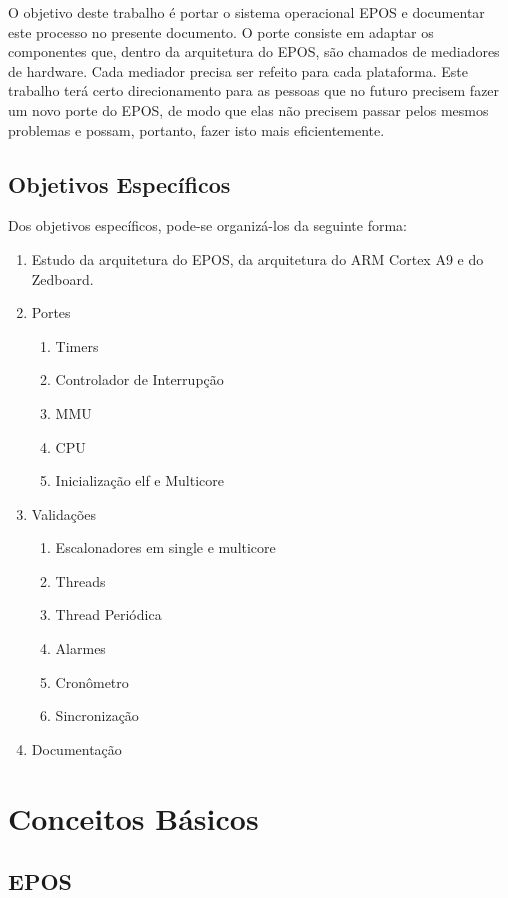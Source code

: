 \documentclass{ufscThesis/ufscThesis} %
\begin{document}
O objetivo deste trabalho é portar o sistema operacional EPOS e documentar este processo no presente documento. O porte consiste em adaptar os componentes que, dentro da arquitetura do EPOS, são chamados de mediadores de hardware. Cada mediador precisa ser refeito para cada plataforma.
Este trabalho terá certo direcionamento para as pessoas que no futuro precisem fazer um novo porte do EPOS, de modo que elas não precisem passar pelos mesmos problemas e possam, portanto, fazer isto mais eficientemente.

\section{Objetivos Específicos}
Dos objetivos específicos, pode-se organizá-los da seguinte forma:

\begin{enumerate}
    \item Estudo da arquitetura do EPOS, da arquitetura do ARM Cortex A9 e do Zedboard.
    \item Portes
    \begin{enumerate}
        \item Timers
        \item Controlador de Interrupção
        \item MMU
        \item CPU
        \item Inicialização elf e Multicore
    \end{enumerate}
    \item Validações
    \begin{enumerate}
        \item Escalonadores em single e multicore
        \item Threads
        \item Thread Periódica
        \item Alarmes
        \item Cronômetro
        \item Sincronização
    \end{enumerate}
    \item Documentação
\end{enumerate}

\chapter{Conceitos Básicos}

\section{EPOS}
\end{document}
